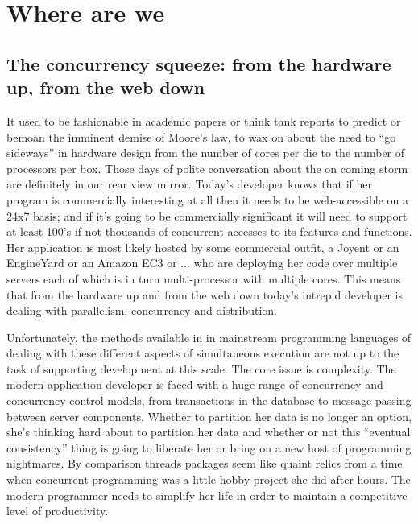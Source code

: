 \section{Where are we}

\subsection{The concurrency squeeze: from the hardware up, from the web down}

It used to be fashionable in academic papers or think tank reports to
predict or bemoan the imminent demise of Moore's law, to wax on about
the need to ``go sideways'' in hardware design from the number of
cores per die to the number of processors per box. Those days of
polite conversation about the on coming storm are definitely in our
rear view mirror. Today's developer knows that if her program is
commercially interesting at all then it needs to be web-accessible on
a 24x7 basis; and if it's going to be commercially significant it will
need to support at least 100's if not thousands of concurrent accesses
to its features and functions. Her application is most likely hosted
by some commercial outfit, a Joyent or an EngineYard or an Amazon EC3
or $\ldots$ who are deploying her code over multiple servers each of
which is in turn multi-processor with multiple cores. This means that
from the hardware up and from the web down today's intrepid developer
is dealing with parallelism, concurrency and distribution.

Unfortunately, the methods available in in mainstream programming
languages of dealing with these different aspects of simultaneous
execution are not up to the task of supporting development at this
scale. The core issue is complexity. The modern application developer
is faced with a huge range of concurrency and concurrency control
models, from transactions in the database to message-passing between
server components. Whether to partition her data is no longer an
option, she's thinking hard about  to partition her data and
whether or not this ``eventual consistency'' thing is going to
liberate her or bring on a new host of programming nightmares. By
comparison threads packages seem like quaint relics from a time when
concurrent programming was a little hobby project she did after
hours. The modern programmer needs to simplify her life in order to
maintain a competitive level of productivity.

